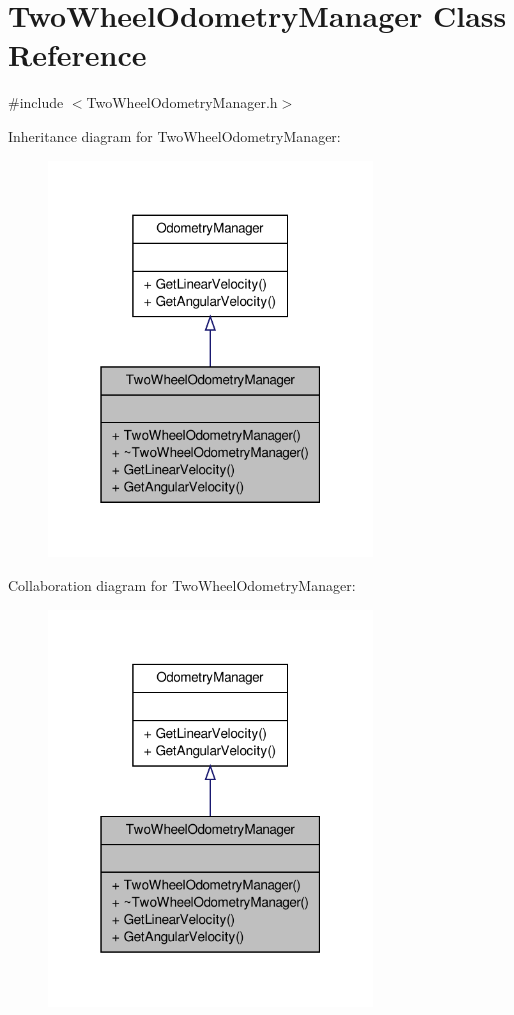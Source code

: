 \hypertarget{class_two_wheel_odometry_manager}{\section{Two\-Wheel\-Odometry\-Manager Class Reference}
\label{class_two_wheel_odometry_manager}
}


{\ttfamily \#include $<$Two\-Wheel\-Odometry\-Manager.\-h$>$}



Inheritance diagram for Two\-Wheel\-Odometry\-Manager\-:
\nopagebreak
\begin{figure}[H]
\begin{center}
\leavevmode
\includegraphics[width=244pt]{class_two_wheel_odometry_manager__inherit__graph}
\end{center}
\end{figure}


Collaboration diagram for Two\-Wheel\-Odometry\-Manager\-:
\nopagebreak
\begin{figure}[H]
\begin{center}
\leavevmode
\includegraphics[width=244pt]{class_two_wheel_odometry_manager__coll__graph}
\end{center}
\end{figure}
